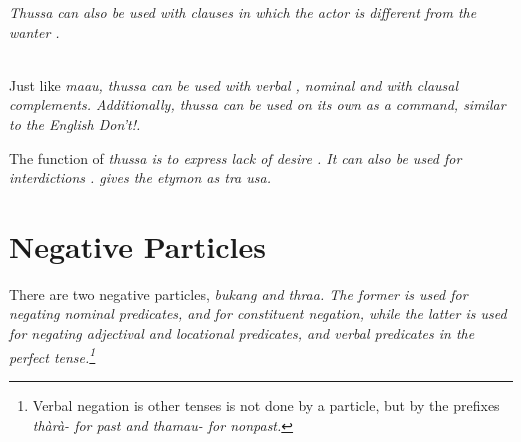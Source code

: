 \em Thussa \em can also be used with clauses in which the actor is different from the wanter .


\\



Just like \em maau, thussa \em can be used with verbal , nominal  and with clausal complements. Additionally, \em thussa \em can be used on its own as a command, similar to the English \em Don't!\em.




%


%


The function of \em thussa \em is to express lack of desire . It can also be used for interdictions .
\citep{Adelaar1991} gives the etymon as \em*tra usa\em.


\section{Negative Particles}\label{sec:wc:NegativeParticles}
There are two negative particles, \em bukang \em and \em thraa\em. The former is used for negating nominal predicates, and for constituent negation, while the latter is used for negating adjectival and locational predicates, and verbal predicates in the perfect tense.\footnote{Verbal negation is other tenses is not done by a particle, but by the prefixes \em thàrà- \em {} for past and \em thamau- \em {} for nonpast.}

